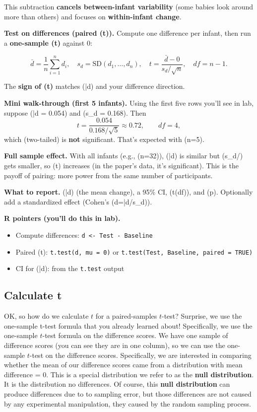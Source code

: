 \documentclass[
  letterpaper,
  DIV=11,
  numbers=noendperiod]{scrreprt}
\providecommand{\tightlist}{%
  \setlength{\itemsep}{0pt}\setlength{\parskip}{0pt}}
\begin{document}
This subtraction \textbf{cancels between-infant variability} (some
babies look around more than others) and focuses on
\textbf{within-infant change}.

\textbf{Test on differences (paired (t)).} Compute one difference per
infant, then run a \textbf{one-sample (t)} against 0:

\[
\bar d=\frac{1}{n}\sum_{i=1}^n d_i, \quad
s_d=\text{SD}(d_1,\ldots,d_n), \quad
t = \frac{\bar d - 0}{s_d/\sqrt{n}}, \quad df=n-1.
\]

The \textbf{sign of (t)} matches (\bar d) and your difference direction.

\textbf{Mini walk-through (first 5 infants).} Using the first five rows
you'll see in lab, suppose (\bar d = 0.054) and (s\_d = 0.168). Then \[
t=\frac{0.054}{0.168/\sqrt{5}} \approx 0.72,\qquad df=4,
\] which (two-tailed) is \textbf{not} significant. That's expected with
(n=5).

\textbf{Full sample effect.} With all infants (e.g., (n=32)), (\bar d)
is similar but (s\_d/) gets smaller, so (t) increases (in the
paper's data, it's significant). This is the payoff of pairing: more
power from the same number of participants.

\textbf{What to report.} (\bar d) (the mean change), a 95\% CI, (t(df)),
and (p). Optionally add a standardized effect (Cohen's (d=\bar d/s\_d)).

\textbf{R pointers (you'll do this in lab).}

\begin{itemize}
\tightlist
\item
  Compute differences: \texttt{d\ \textless{}-\ Test\ -\ Baseline}
\item
  Paired (t): \texttt{t.test(d,\ mu\ =\ 0)} or
  \texttt{t.test(Test,\ Baseline,\ paired\ =\ TRUE)}
\item
  CI for (\bar d): from the \texttt{t.test} output
\end{itemize}

\subsection{Calculate t}\label{calculate-t}

OK, so how do we calculate \(t\) for a paired-samples \(t\)-test?
Surprise, we use the one-sample t-test formula that you already learned
about! Specifically, we use the one-sample \(t\)-test formula on the
difference scores. We have one sample of difference scores (you can see
they are in one column), so we can use the one-sample \(t\)-test on the
difference scores. Specifically, we are interested in comparing whether
the mean of our difference scores came from a distribution with mean
difference = 0. This is a special distribution we refer to as the
\textbf{null distribution}. It is the distribution no differences. Of
course, this \textbf{null distribution} can produce differences due to
to sampling error, but those differences are not caused by any
experimental manipulation, they caused by the random sampling process.
\end{document}
